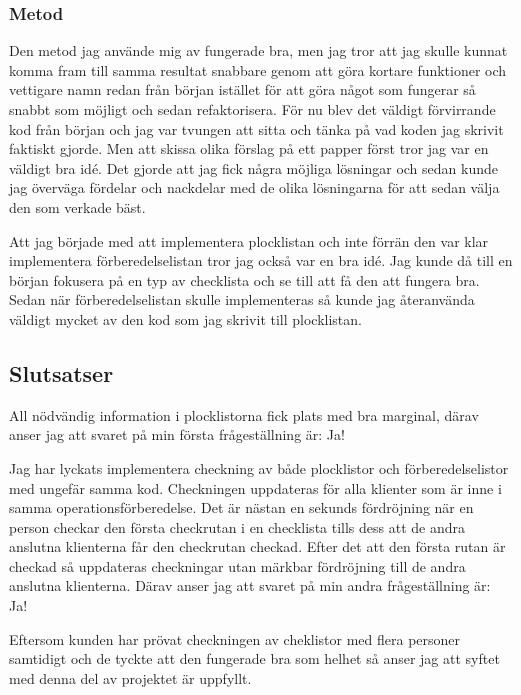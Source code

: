 \subsubsection{Metod}
Den metod jag använde mig av fungerade bra, men jag tror att jag skulle kunnat komma fram till samma resultat snabbare genom att göra kortare funktioner och vettigare namn redan från början istället för att göra något som fungerar så snabbt som möjligt och sedan refaktorisera. För nu blev det väldigt förvirrande kod från början och jag var tvungen att sitta och tänka på vad koden jag skrivit faktiskt gjorde. Men att skissa olika förslag på ett papper först tror jag var en väldigt bra idé. Det gjorde att jag fick några möjliga lösningar och sedan kunde jag överväga fördelar och nackdelar med de olika lösningarna för att sedan välja den som verkade bäst.

Att jag började med att implementera plocklistan och inte förrän den var klar implementera förberedelselistan tror jag också var en bra idé. Jag kunde då till en början fokusera på en typ av checklista och se till att få den att fungera bra. Sedan när förberedelselistan skulle implementeras så kunde jag återanvända väldigt mycket av den kod som jag skrivit till plocklistan.
\pagebreak
\subsection{Slutsatser}
All nödvändig information i plocklistorna fick plats med bra marginal, därav anser jag att svaret på min första frågeställning är: Ja!

Jag har lyckats implementera checkning av både plocklistor och förberedelselistor med ungefär samma kod. Checkningen uppdateras för alla klienter som är inne i samma operationsförberedelse. Det är nästan en sekunds fördröjning när en person checkar den första checkrutan i en checklista tills dess att de andra anslutna klienterna får den checkrutan checkad. Efter det att den första rutan är checkad så uppdateras checkningar utan märkbar fördröjning till de andra anslutna klienterna. Därav anser jag att svaret på min andra frågeställning är: Ja!

Eftersom kunden har prövat checkningen av cheklistor med flera personer samtidigt och de tyckte att den fungerade bra som helhet så anser jag att syftet med denna del av projektet är uppfyllt.

